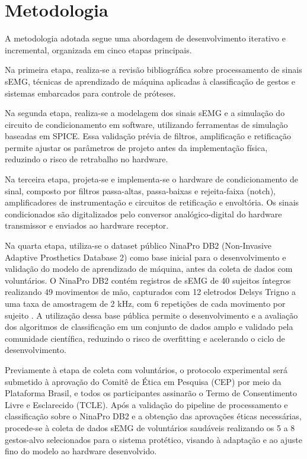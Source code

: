 \section{Metodologia}

A metodologia adotada segue uma abordagem de desenvolvimento iterativo e incremental, organizada em cinco etapas principais. 

Na primeira etapa, realiza-se a revisão bibliográfica sobre processamento de sinais sEMG, técnicas de aprendizado de máquina aplicadas à classificação de gestos e sistemas embarcados para controle de próteses.

Na segunda etapa, realiza-se a modelagem dos sinais sEMG e a simulação do circuito de condicionamento em software, utilizando ferramentas de simulação baseadas em SPICE. Essa validação prévia de filtros, amplificação e retificação permite ajustar os parâmetros de projeto antes da implementação física, reduzindo o risco de retrabalho no hardware.

Na terceira etapa, projeta-se e implementa-se o hardware de condicionamento de sinal, composto por filtros passa-altas, passa-baixas e rejeita-faixa (notch), amplificadores de instrumentação e circuitos de retificação e envoltória. Os sinais condicionados são digitalizados pelo conversor analógico-digital do hardware transmissor e enviados ao hardware receptor.

Na quarta etapa, utiliza-se o dataset público NinaPro \cite{Ninapro} DB2 (Non-Invasive Adaptive Prosthetics Database 2) como base inicial para o desenvolvimento e validação do modelo de aprendizado de máquina, antes da coleta de dados com voluntários. O NinaPro DB2 contém registros de sEMG de 40 sujeitos íntegros realizando 49 movimentos de mão, capturados com 12 eletrodos Delsys Trigno a uma taxa de amostragem de 2 kHz, com 6 repetições de cada movimento por sujeito \cite{Atzori2014Electromyography}. A utilização dessa base pública permite o desenvolvimento e a avaliação dos algoritmos de classificação em um conjunto de dados amplo e validado pela comunidade científica, reduzindo o risco de overfitting e acelerando o ciclo de desenvolvimento. 

Previamente à etapa de coleta com voluntários, o protocolo experimental será submetido à aprovação do Comitê de Ética em Pesquisa (CEP) por meio da Plataforma Brasil, e todos os participantes assinarão o Termo de Consentimento Livre e Esclarecido (TCLE). Após a validação do pipeline de processamento e classificação sobre o NinaPro DB2 e a obtenção das aprovações éticas necessárias, procede-se à coleta de dados sEMG de voluntários saudáveis realizando os 5 a 8 gestos-alvo selecionados para o sistema protético, visando à adaptação e ao ajuste fino do modelo ao hardware desenvolvido.